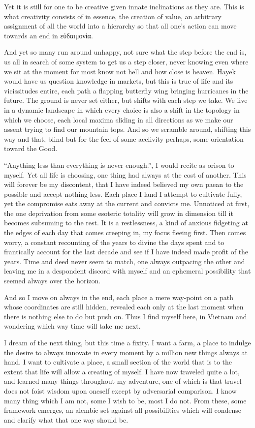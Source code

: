 \documentclass[ebook, 10pt, openright, onecolumn]{memoir}
\newcommand{\textgreek}[1]{\begingroup\fontencoding{LGR}\selectfont#1\endgroup}
\begin{document}
Yet it is still for one to be creative given innate inclinations as they are.
This is what creativity consists of in essence, the creation of value, an
arbitrary assignment of all the world into a hierarchy so that all one's action
can move towards an end in \textgreek{εὐδαιμονία}.

And yet so many run around unhappy, not sure what the step before the end is, us
all in search of some system to get us a step closer, never knowing even where
we sit at the moment for most know not hell and how close is heaven.  Hayek
would have us question knowledge in markets, but this is true of life and its
vicissitudes entire, each path a flapping butterfly wing bringing hurricanes in
the future. The ground is never set either, but shifts with each step we take.
We live in a dynamic landscape in which every choice is also a shift in the
topology in which we choose, each local maxima sliding in all directions as we
make our assent trying to find our mountain tops.  And so we scramble around,
shifting this way and that, blind but for the feel of some acclivity perhaps,
some orientation toward the Good.

``Anything less than everything is never enough.'', I would recite as orison to
myself.  Yet all life is choosing, one thing had always at the cost of another.
This will forever be my discontent, that I have indeed believed my own paean to
the possible and accept nothing less.  Each place I land I attempt to cultivate
fully, yet the compromise eats away at the current and convicts me.  Unnoticed
at first, the one deprivation from some esoteric totality will grow in dimension
till it becomes subsuming to the rest.  It is a restlessness, a kind of anxious
fidgeting at the edges of each day that comes creeping in, my focus fleeing
first.  Then comes worry, a constant recounting of the years to divine the days
spent and to frantically account for the last decade and see if I have indeed
made profit of the years.  Time and deed never seem to match, one always
outpacing the other and leaving me in a despondent discord with myself and an
ephemeral possibility that seemed always over the horizon.

And so I move on always in the end, each place a mere way-point on a path whose
coordinates are still hidden, revealed each only at the last moment when there
is nothing else to do but push on.  Thus I find myself here, in Vietnam and
wondering which way time will take me next.

I  dream of the next thing, but this time a fixity.  I want a farm, a place to
indulge the desire to always innovate in every moment by a million new things
always at hand.  I want to cultivate a place, a small section of the world that
is to the extent that life will allow a creating of myself.  I have now traveled
quite a lot, and learned many things throughout my adventure, one of which is
that travel does not foist wisdom upon oneself except by adversarial
comparison.  I know many thing which I am not, some I wish to be, most I do
not.  From these, some framework emerges, an alembic set against all
possibilities which will condense and clarify what that one way should be.
\end{document}
